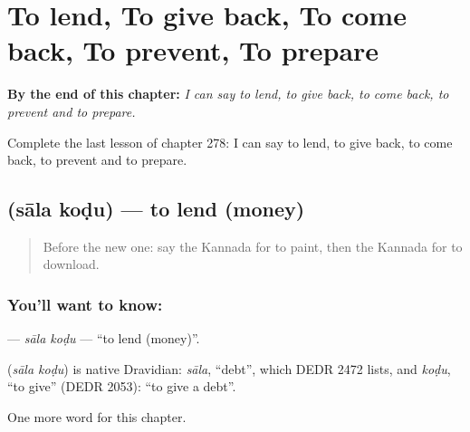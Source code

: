 
\chapter{To lend, To give back, To come back, To prevent, To prepare}
\label{ch:ka-to-lend-to-give-back-to-come-back-to-prevent-to-prepare}

\begin{chapteropening}
\textbf{By the end of this chapter:} \emph{I can say to lend, to give back, to come back, to prevent and to prepare.}

Complete the last lesson of chapter 278: I can say to lend, to give back, to come back, to prevent and to prepare.
\end{chapteropening}

\section[\texorpdfstring{\kn{ಸಾಲ} \kn{ಕೊಡು} (sāla koḍu)}{ಸಾಲ ಕೊಡು (sāla koḍu)}]{  (sāla koḍu) — to lend (money)}

\label{lesson:KA-C278-sala-kodu}



\begin{quote}
Before the new one: say the Kannada for to paint, then the Kannada for to download.
\end{quote}

\subsection*{You'll want to know:  }
\textbf{ } — \emph{sāla koḍu} — \textquotedblleft{}to lend (money)\textquotedblright{}.

\begin{cousinweb}
\textbf{ } (\emph{sāla koḍu}) is native Dravidian: \emph{sāla}, \textquotedblleft{}debt\textquotedblright{}, which DEDR 2472 lists, and \emph{koḍu}, \textquotedblleft{}to give\textquotedblright{} (DEDR 2053): \textquotedblleft{}to give a debt\textquotedblright{}.
\end{cousinweb}

\begin{grammarlens}[title={What you've built}]
One more word for this chapter.
\end{grammarlens}


